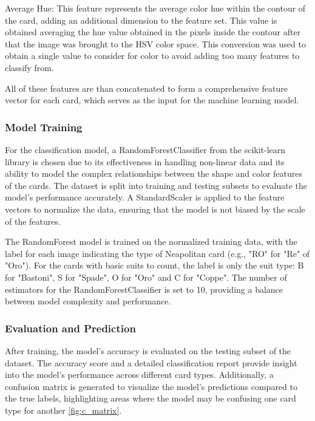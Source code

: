 \documentclass[twocolumn, a4paper,10pt]{article}
\begin{document}
Average Hue: This feature represents the average color hue within the contour of the card, adding an additional dimension to the feature set. This value is obtained averaging the hue value obtained in the pixels inside the contour after that the image was brought to the HSV color space.
This conversion was used to obtain a single value to consider for color to avoid adding too many features to classify from.

All of these features are than concatenated to form a comprehensive feature vector for each card, which serves as the input for the machine learning model.

\subsubsection*{Model Training}
For the classification model, a RandomForestClassifier from the scikit-learn library is chosen due to its effectiveness in handling non-linear data and its ability to model the complex relationships between the shape and color features of the cards. The dataset is split into training and testing subsets to evaluate the model's performance accurately. A StandardScaler is applied to the feature vectors to normalize the data, ensuring that the model is not biased by the scale of the features.

The RandomForest model is trained on the normalized training data, with the label for each image indicating the type of Neapolitan card (e.g., "RO" for "Re" of "Oro"). For the cards with basic suits to count, the label is only the suit type: B for "Bastoni", S for "Spade", O for "Oro" and C for "Coppe". The number of estimators for the RandomForestClassifier is set to 10, providing a balance between model complexity and performance.

\subsubsection*{Evaluation and Prediction}
After training, the model's accuracy is evaluated on the testing subset of the dataset. The accuracy score and a detailed classification report provide insight into the model's performance across different card types. Additionally, a confusion matrix is generated to visualize the model's predictions compared to the true labels, highlighting areas where the model may be confusing one card type for another \ref{fig:c_matrix}.
\end{document}
